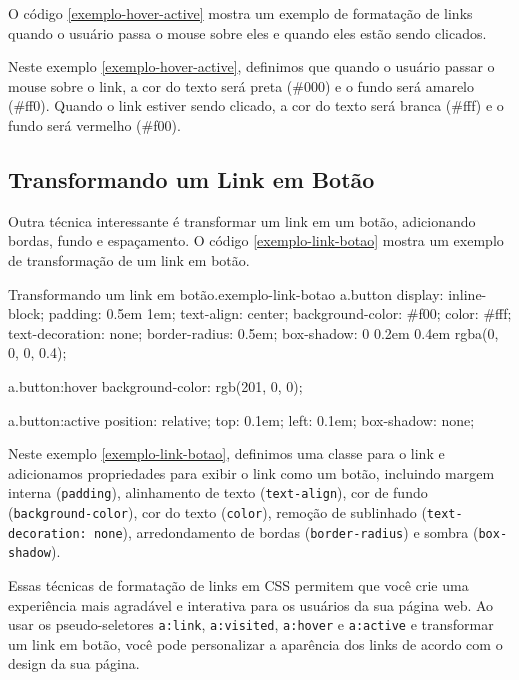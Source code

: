 O código \ref{exemplo-hover-active} mostra um exemplo de formatação de links quando o usuário passa o mouse sobre eles e quando eles estão sendo clicados.


Neste exemplo \ref{exemplo-hover-active}, definimos que quando o usuário passar o mouse sobre o link, a cor do texto será preta (\#000) e o fundo será amarelo (\#ff0). Quando o link estiver sendo clicado, a cor do texto será branca (\#fff) e o fundo será vermelho (\#f00).

\subsection{Transformando um Link em Botão}

Outra técnica interessante é transformar um link em um botão, adicionando bordas, fundo e espaçamento. O código \ref{exemplo-link-botao} mostra um exemplo de transformação de um link em botão.

\begin{csscode}{Transformando um link em botão.}{exemplo-link-botao}
a.button {
    display: inline-block;
    padding: 0.5em 1em;
    text-align: center;
    background-color: #f00;
    color: #fff;
    text-decoration: none;
    border-radius: 0.5em;
    box-shadow: 0 0.2em 0.4em rgba(0, 0, 0, 0.4);
}

a.button:hover {
    background-color: rgb(201, 0, 0);
}

a.button:active {
    position: relative;
    top: 0.1em;
    left: 0.1em;
    box-shadow: none;
}
\end{csscode}

Neste exemplo \ref{exemplo-link-botao}, definimos uma classe  para o link e adicionamos propriedades para exibir o link como um botão, incluindo margem interna (\texttt{padding}), alinhamento de texto (\texttt{text-align}), cor de fundo (\texttt{background-color}), cor do texto (\texttt{color}), remoção de sublinhado (\texttt{text-decoration: none}), arredondamento de bordas (\texttt{border-radius}) e sombra (\texttt{box-shadow}).

Essas técnicas de formatação de links em CSS permitem que você crie uma experiência mais agradável e interativa para os usuários da sua página web. Ao usar os pseudo-seletores \texttt{a:link}, \texttt{a:visited}, \texttt{a:hover} e \texttt{a:active} e transformar um link em botão, você pode personalizar a aparência dos links de acordo com o design da sua página.

